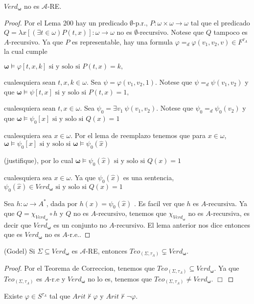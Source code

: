   \begin{lemma} \label{lemma_119}
    \PN $Verd_{\mathbf{\omega}}$ no es $\mathcal{A}$-RE.
  \end{lemma}
  \begin{proof}
    Por el Lema 200 hay un predicado $\emptyset $-p.r., $ P:\omega \times \omega \rightarrow \omega $ tal que el predicado $Q=\lambda x \left[ (\exists t\in \omega )P(t,x)\right] :\omega \rightarrow \omega $ no es $\emptyset $-recursivo. Notese que $Q$ tampoco es $A$-recursivo. Ya que $P $ es representable, hay una formula $\varphi =_{d}\varphi (v_{1},v_{2},v)\in F^{\tau _{A}}$ la cual cumple

    $\displaystyle \mathbf{\omega }\models \varphi \left[ t,x,k\right] \text{ si y solo si } P(t,x)=k, $

    cualesquiera sean $t,x,k\in \omega .$ Sea $\psi =\varphi (v_{1},v_{2},1)$. Notese que $\psi =_{d}\psi (v_{1},v_{2})$ y que
    $\displaystyle \mathbf{\omega }\models \psi \left[ t,x\right] \text{ si y solo si }P(t,x)=1 \text{,} $

    cualesquiera sean $t,x\in \omega .$ Sea $\psi_{0}=\exists v_{1}\ \psi (v_{1},v_{2})$. Notese que $\psi_{0}=_{d}\psi_{0}(v_{2})$ y que
    $\displaystyle \mathbf{\omega }\models \psi_{0}\left[ x\right] \text{ si y solo si }Q(x)=1 $

    cualesquiera sea $x\in \omega $. Por el lema de reemplazo tenemos que para $ x\in \omega $,
    $\displaystyle \mathbf{\omega }\models \psi_{0}\left[ x\right] \text{ si y solo si } \mathbf{\omega }\models \psi_{0}(\widehat{x}) $

    (justifique), por lo cual
    $\displaystyle \mathbf{\omega }\models \psi_{0}(\widehat{x})\text{ si y solo si }Q(x)=1 $

    cualesquiera sea $x\in \omega $. Ya que $\psi_{0}(\widehat{x})$ es una sentencia,
    $\displaystyle \psi_{0}(\widehat{x})\in Verd_{\mathbf{\omega }}\text{ si y solo si }Q(x)=1 $

    Sea $h:\omega \rightarrow A^{\ast }$, dada por $h(x)=\psi_{0}(\widehat{x})$ . Es facil ver que $h$ es $A$-recursiva. Ya que $Q=\chi _{Verd_{\mathbf{ \omega }}}\circ h$ y $Q$ no es $A$-recursivo, tenemos que $\chi _{Verd_{ \mathbf{\omega }}}$ no es $A$-recursiva, es decir que $Verd_{\mathbf{\omega } }$ es un conjunto no $A$-recursivo. El lema anterior nos dice entonces que es $Verd_{\mathbf{\omega }}$ no es $A$-r.e..
  \end{proof}

  \begin{theorem} \label{theorem_120}
    \PN (Godel) Si $\Sigma \subseteq Verd_{\mathbf{\omega}}$ es $\mathcal{A}$-RE, entonces $Teo_{(\Sigma, \tau_{A})}
    \subsetneq Verd_{\mathbf{\omega}}$.
  \end{theorem}
  \begin{proof}
    Por el Teorema de Correccion, tenemos que $Teo_{(\Sigma ,\tau _{A})}\subseteq Verd_{\mathbf{\omega }}$. Ya que $Teo_{(\Sigma ,\tau _{A})}$ es $A$-r.e y $Verd_{\mathbf{\omega }}$ no lo es, tenemos que $Teo_{(\Sigma ,\tau _{A})}\neq Verd_{\mathbf{\omega }}$. $\Box$
  \end{proof}

  \begin{corollary} \label{corollary_121}
    \PN Existe $\varphi \in S^{\tau_{A}}$ tal que $Arit \nvdash \varphi$ y $Arit \nvdash \lnot \varphi$.
  \end{corollary}
